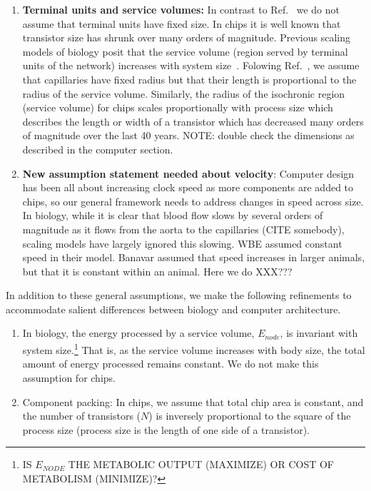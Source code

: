 \documentclass[12pt]{article}
\begin{document}
\begin{enumerate}
\item {\bf Terminal units and service volumes:} In contrast to Ref.~\cite{west97} we
  do not assume that terminal units have
  fixed size.   In chips it is well known that transistor size has
  shrunk over many orders of magnitude.   Previous scaling models of
  biology posit that the service volume (region served by terminal units of the network) increases with system
  size~\cite{west97,banavar10}.  Folowing Ref.~\cite{banavar10}, we assume that
  capillaries have fixed radius but that their length is proportional to the
  radius of the service volume.   Similarly, the radius of the isochronic region
  (service volume) for chips scales proportionally with process size
  which describes the length or width of a transistor which has decreased many orders of magnitude over the last 40 years.
  NOTE: double check the dimensions as described in the computer section.

\item {\bf New assumption statement needed about velocity}: Computer design has been all about increasing clock speed as more components are added to chips, so our general framework needs to address changes in speed across size. In biology, while it is clear that blood flow slows by several orders of magnitude as it flows from the aorta to the capillaries (CITE somebody), scaling models have largely ignored this slowing. WBE assumed constant speed in their model. Banavar assumed that speed increases in larger animals, but that it is constant within an animal. Here we do XXX???
\end{enumerate}

In addition to these general assumptions, we make the following
refinements to accommodate salient differences between biology and computer architecture.
\begin{enumerate}
\item In biology, the energy processed by a service volume,
  $E_{node}$, is invariant with system size.\footnote{IS $E_{NODE}$ THE METABOLIC OUTPUT (MAXIMIZE) OR COST OF METABOLISM
  (MINIMIZE)?}  That is, as the service volume
  increases with body size, the total amount of energy processed
  remains constant.   We do not make this assumption for chips.

\item Component packing: In chips, we assume that total chip area is constant, and the
  number of transistors ($N$) is inversely proportional to the square of the process size (process size is
  the length of one side of a transistor). 

\end{enumerate}
\end{document}
